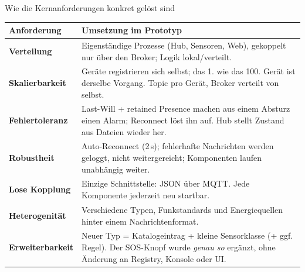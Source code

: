 \documentclass[aspectratio=169,11pt]{beamer}
\begin{document}
\begin{frame}{Wie die Kernanforderungen konkret gel\"ost sind}
  \scriptsize
  \begin{tabular}{@{}p{} p{}@{}}
    \toprule
    \textbf{Anforderung} & \textbf{Umsetzung im Prototyp} \\
    \midrule
    \textbf{Verteilung} & Eigenst\"andige Prozesse (Hub, Sensoren, Web), gekoppelt nur \"uber den Broker; Logik lokal/verteilt. \\[2pt]
    \textbf{Skalierbarkeit} & Ger\"ate registrieren sich selbst; das 1. wie das 100. Ger\"at ist derselbe Vorgang. Topic pro Ger\"at, Broker verteilt von selbst. \\[2pt]
    \textbf{Fehlertoleranz} & Last-Will + retained Presence machen aus einem Absturz einen Alarm; Reconnect l\"ost ihn auf. Hub stellt Zustand aus Dateien wieder her. \\[2pt]
    \textbf{Robustheit} & Auto-Reconnect (2\,s); fehlerhafte Nachrichten werden geloggt, nicht weitergereicht; Komponenten laufen unabh\"angig weiter. \\[2pt]
    \textbf{Lose Kopplung} & Einzige Schnittstelle: JSON \"uber MQTT. Jede Komponente jederzeit neu startbar. \\[2pt]
    \textbf{Heterogenit\"at} & Verschiedene Typen, Funkstandards und Energiequellen hinter einem Nachrichtenformat. \\[2pt]
    \textbf{Erweiterbarkeit} & Neuer Typ = Katalogeintrag + kleine Sensorklasse (+ ggf. Regel). Der SOS-Knopf wurde \emph{genau so} erg\"anzt, ohne \"Anderung an Registry, Konsole oder UI. \\
    \bottomrule
  \end{tabular}
\end{frame}
\end{document}
